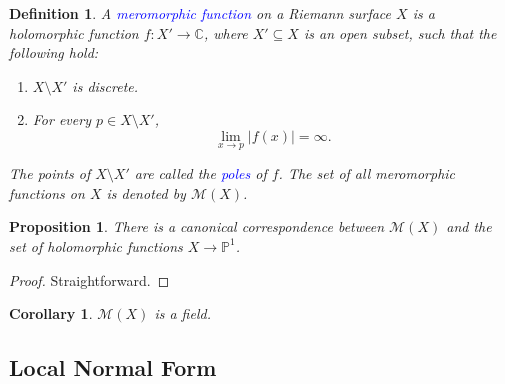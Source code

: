 \documentclass[12pt]{article}
\theoremstyle{thmstyle}
\newtheorem{proposition}[theorem]{Proposition}
\theoremstyle{defstyle}
\newtheorem{definition}[theorem]{Definition}
\newtheorem*{corollary}{Corollary}
\newcommand{\bbC}{\mathbb{C}}
\newcommand{\define}[1]{\textcolor{blue}{\textit{#1}}}
\newcommand{\bbP}{\mathbb{P}}
\newcommand{\scrM}{\mathscr{M}}
\begin{document}
\begin{definition}
    A \define{meromorphic function} on a Riemann surface $X$ is a holomorphic function $f: X'\to\bbC$, where $X'\subseteq X$ is an open subset, such that the following hold:
    \begin{enumerate}[label=(\alph*)]
        \item $X\setminus X'$ is discrete. 
        \item For every $p\in X\setminus X'$, 
        \begin{equation*}
            \lim_{x\to p}|f(x)| = \infty.
        \end{equation*}
    \end{enumerate}
    The points of $X\setminus X'$ are called the \define{poles} of $f$. The set of all meromorphic functions on $X$ is denoted by $\scrM(X)$.
\end{definition}

\begin{proposition}
    There is a canonical correspondence between $\scrM(X)$ and the set of holomorphic functions $X\to\bbP^1$.
\end{proposition}
\begin{proof}
    Straightforward.
\end{proof}

\begin{corollary}
    $\scrM(X)$ is a field.
\end{corollary}

\subsection{Local Normal Form}
\end{document}
